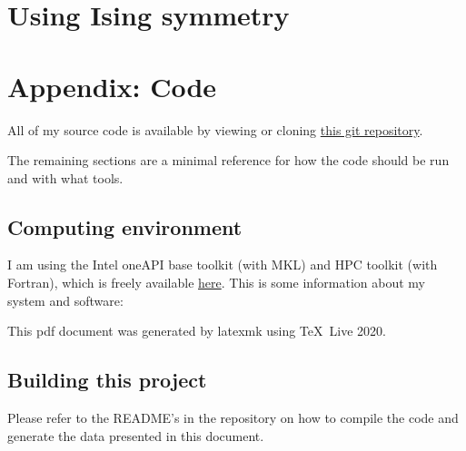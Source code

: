 \documentclass{article}
\begin{document}
\newpage

\section{
Using Ising symmetry
}



\newpage

\section{
Appendix: Code
}

All of my source code is available by viewing or cloning
\href{https://github.com/lxvm/ph121c.git}{this git repository}.

The remaining sections are a minimal reference for how the code
should be run and with what tools.

\subsection{
Computing environment
}

I am using the Intel oneAPI base toolkit (with MKL)
and HPC toolkit (with Fortran), which is freely available
\href{https://software.intel.com/content/www/us/en/develop/
articles/free-intel-software-developer-tools.html}{here}.
This is some information about my system and software:



This pdf document was generated by latexmk using \TeX\ Live 2020.

\subsection{
Building this project
}

Please refer to the README's in the repository on how to compile the
code and generate the data presented in this document.
\end{document}
